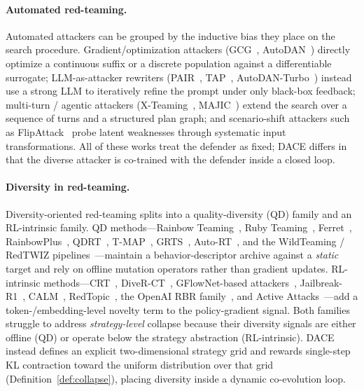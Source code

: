 \documentclass{article}
\newcommand{\method}{\textsc{DACE}\xspace}
\begin{document}
\paragraph{Automated red-teaming.}
Automated attackers can be grouped by the inductive bias they place on the search procedure. Gradient/optimization attackers (GCG~\citep{zou2023universal}, AutoDAN~\citep{liu2023autodan}) directly optimize a continuous suffix or a discrete population against a differentiable surrogate; LLM-as-attacker rewriters (PAIR~\citep{chao2023pair}, TAP~\citep{mehrotra2024tap}, AutoDAN-Turbo~\citep{liu2024autodan}) instead use a strong LLM to iteratively refine the prompt under only black-box feedback; multi-turn / agentic attackers (X-Teaming~\citep{rahman2025xteaming}, MAJIC~\citep{qi2025majic}) extend the search over a sequence of turns and a structured plan graph; and scenario-shift attackers such as FlipAttack~\citep{liu2024flipattack} probe latent weaknesses through systematic input transformations. All of these works treat the defender as fixed; \method differs in that the diverse attacker is co-trained with the defender inside a closed loop.

\paragraph{Diversity in red-teaming.}
Diversity-oriented red-teaming splits into a quality-diversity (QD) family and an RL-intrinsic family. QD methods---Rainbow Teaming~\citep{samvelyan2024rainbow}, Ruby Teaming~\citep{han2024ruby}, Ferret~\citep{pala2025ferret}, RainbowPlus~\citep{dang2025rainbowplus}, QDRT~\citep{wang2025qdrt}, T-MAP~\citep{guo2025tmap}, GRTS~\citep{grts2023}, Auto-RT~\citep{autort2025}, and the WildTeaming / RedTWIZ pipelines~\citep{jiang2024wildteaming, horal2025redtwiz}---maintain a behavior-descriptor archive against a \emph{static} target and rely on offline mutation operators rather than gradient updates. RL-intrinsic methods---CRT~\citep{hong2024curiosity}, DiveR-CT~\citep{zhao2025diverct}, GFlowNet-based attackers~\citep{lee2025gflownet}, Jailbreak-R1~\citep{wang2025jailbreakr1}, CALM~\citep{zheng2025calm}, RedTopic~\citep{redtopic2025}, the OpenAI RBR family~\citep{beutel2024openaidiverse}, and Active Attacks~\citep{activeattacks2025}---add a token-/embedding-level novelty term to the policy-gradient signal. Both families struggle to address \emph{strategy-level} collapse because their diversity signals are either offline (QD) or operate below the strategy abstraction (RL-intrinsic). \method instead defines an explicit two-dimensional strategy grid and rewards single-step KL contraction toward the uniform distribution over that grid (Definition~\ref{def:collapse}), placing diversity inside a dynamic co-evolution loop.
\end{document}
